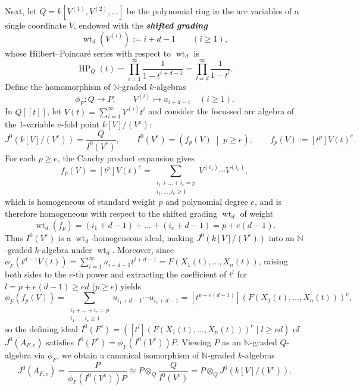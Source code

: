 \documentclass[a4paper, 12pt]{amsart}
\newcommand{\defterm}[1]{\textbf{\textit{#1}}\index{#1}}
\theoremstyle{remark}
\begin{document}
Next, let $Q = k[V^{(1)}, V^{(2)}, \dots]$ be the polynomial ring in the arc variables of a single coordinate $V$,
endowed with the \defterm{shifted grading}
\begin{equation}
  \operatorname{wt}_d(V^{(i)}) := i + d - 1 \qquad (i \ge 1),
\end{equation}
whose Hilbert--Poincaré series with respect to $\operatorname{wt}_d$ is
\begin{equation}
  \operatorname{HP}_{Q}(t) = \prod_{i = 1}^\infty \frac{1}{1 - t^{i + d - 1}} = \prod_{l = d}^\infty \frac{1}{1 - t^l}.
\end{equation}
Define the homomorphism of $\mathbb{N}$-graded $k$-algebras
\begin{equation}
  \phi_F \colon Q \longrightarrow P, \qquad V^{(i)} \longmapsto u_{i + d - 1} \quad (i \ge 1).
\end{equation}
In $Q[[t]]$, let $V(t) = \sum_{i = 1}^\infty V^{(i)} t^i$ and consider the focussed arc algebra of the 1-variable $e$-fold point $k[V]/(V^e)$:
\begin{equation}
  J^0\left(k[V]/(V^e)\right) = \frac{Q}{I^0(V^e)}, \qquad
  I^0(V^e) = \left( f_p(V) \;\middle|\; p \ge e \right), \qquad
  f_p(V) := [t^p] V(t)^e.
\end{equation}
For each $p \ge e$, the Cauchy product expansion gives
\begin{equation*}
  f_p(V) = [t^p] V(t)^e = \sum_{\substack{i_1 + \dots + i_e = p \\ i_1, \dots, i_e \ge 1}} V^{(i_1)} \cdots V^{(i_e)},
\end{equation*}
which is homogeneous of standard weight $p$ and polynomial degree $e$,
and is therefore homogeneous with respect to the shifted grading $\operatorname{wt}_d$ of weight
\begin{equation*}
  \operatorname{wt}_d(f_p) = (i_1 + d - 1) + \dots + (i_e + d - 1) = p + e(d - 1).
\end{equation*}
Thus $I^0(V^e)$ is a $\operatorname{wt}_d$-homogeneous ideal,
making $J^0(k[V]/(V^e))$ into an $\mathbb{N}$-graded $k$-algebra under $\operatorname{wt}_d$.
Moreover,
since $\phi_F(t^{d - 1} V(t)) = \sum_{i = 1}^\infty u_{i + d - 1} t^{i + d - 1} = F(X_1(t), \dots, X_n(t))$,
raising both sides to the $e$-th power and extracting the coefficient of $t^l$ for $l = p + e(d - 1) \ge e d$ ($p \ge e$) yields
\begin{equation*}
  \phi_F\left(f_p(V)\right)
  = \sum_{\substack{i_1 + \dots + i_e = p \\ i_1, \dots, i_e \ge 1}} u_{i_1 + d - 1} \cdots u_{i_e + d - 1}
  = [t^{p + e(d - 1)}] \left(F(X_1(t), \dots, X_n(t))\right)^e,
\end{equation*}
so the defining ideal $I^0(F^e) = \left([t^l](F(X_1(t), \dots, X_n(t)))^e \mid l \ge e d\right)$ of $J^0(A_{F, e})$ satisfies $I^0(F^e) = \phi_F(I^0(V^e)) P$.
Viewing $P$ as an $\mathbb{N}$-graded $Q$-algebra via $\phi_F$,
we obtain a canonical isomorphism of $\mathbb{N}$-graded $k$-algebras
\begin{equation}
  \label{eq:JN-quotient-phi}
  J^0(A_{F, e}) = \frac{P}{\phi_F(I^0(V^e)) P} \cong P \otimes_{Q} \frac{Q}{I^0(V^e)} = P \otimes_{Q} J^0\left(k[V]/(V^e)\right).
\end{equation}
\end{document}
